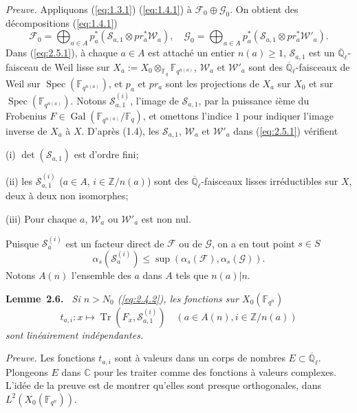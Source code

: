 \documentclass[10pt,a4paper]{article}
\makeatletter
\theoremstyle{plain}
\theoremstyle{definition}
\newenvironment{manualblock}[4]{%
  \par\medskip\noindent\textbf{#1~#2#3.}\def\@currentlabel{#2}\label{#4}\itshape\ }{\par\normalfont\medskip}
\DeclareMathOperator{\Spec}{Spec}
\DeclareMathOperator{\Gal}{Gal}
\DeclareMathOperator{\tr}{Tr}
\makeatother
\begin{document}
\noindent\textit{Preuve.} Appliquons (\ref{eq:1.3.1}) (\ref{eq:1.4.1}) \`a $\mathcal{F}_0 \oplus \mathcal{G}_0$. On obtient des d\'ecompositions (\ref{eq:1.4.1})
\begin{equation}\label{eq:2.5.1}
\mathcal{F}_0 = \bigoplus_{a \in A} p_a^*(\mathcal{S}_{a,1} \otimes pr_a^* \mathcal{W}_a), \quad \mathcal{G}_0 = \bigoplus_{a \in A} p_a^*(\mathcal{S}_{a,1} \otimes pr_a^* \mathcal{W}'_a).
\end{equation}
Dans (\ref{eq:2.5.1}), \`a chaque $a \in A$ est attach\'e un entier $n(a) \geq 1$, $\mathcal{S}_{a,1}$ est un $\overline{\mathbb{Q}}_\ell$-faisceau de Weil lisse sur $X_a := X_0 \otimes_{\mathbb{F}_q} \mathbb{F}_{q^{n(a)}}$, $\mathcal{W}_a$ et $\mathcal{W}'_a$ sont des $\overline{\mathbb{Q}}_\ell$-faisceaux de Weil sur $\Spec(\mathbb{F}_{q^{n(a)}})$, et $p_a$ et $pr_a$ sont les projections de $X_a$ sur $X_0$ et sur $\Spec(\mathbb{F}_{q^{n(a)}})$. Notons $\mathcal{S}_{a,1}^{(i)}$, l'image de $\mathcal{S}_{a,1}$, par la puissance $i$\`eme du Frobenius $F \in \Gal(\mathbb{F}_{q^{n(a)}}/\mathbb{F}_q)$, et omettons l'indice $1$ pour indiquer l'image inverse de $X_a$ \`a $X$. D'apr\`es (1.4), les $\mathcal{S}_{a,1}$, $\mathcal{W}_a$ et $\mathcal{W}'_a$ dans (\ref{eq:2.5.1}) v\'erifient

(i) $\det(\mathcal{S}_{a,1})$ est d'ordre fini;

(ii) les $\mathcal{S}_{a,1}^{(i)}$ ($a \in A$, $i \in \mathbb{Z}/n(a)$) sont des $\overline{\mathbb{Q}}_\ell$-faisceaux lisses irr\'eductibles sur $X$, deux \`a deux non isomorphes;

(iii) Pour chaque $a$, $\mathcal{W}_a$ ou $\mathcal{W}'_a$ est non nul.

Puisque $\mathcal{S}_a^{(i)}$ est un facteur direct de $\mathcal{F}$ ou de $\mathcal{G}$, on a en tout point $s \in S$
\[
\alpha_s(\mathcal{S}_a^{(i)}) \leq \sup(\alpha_s(\mathcal{F}), \alpha_s(\mathcal{G})).
\]
Notons $A(n)$ l'ensemble des $a$ dans $A$ tels que $n(a) | n$.

\begin{manualblock}{Lemme}{2.6}{}{lem:2.6}
Si $n > N_0$ (\ref{eq:2.4.2}), les fonctions sur $X_0(\mathbb{F}_{q^n})$
\[
t_{a,i}: x \mapsto \tr(F_x, \mathcal{S}_{a,1}^{(i)}) \quad (a \in A(n), i \in \mathbb{Z}/n(a))
\]
sont lin\'eairement ind\'ependantes.
\end{manualblock}

\noindent\textit{Preuve.} Les fonctions $t_{a,i}$ sont \`a valeurs dans un corps de nombres $E \subset \overline{\mathbb{Q}}_\ell$. Plongeons $E$ dans $\mathbb{C}$ pour les traiter comme des fonctions \`a valeurs complexes. L'id\'ee de la preuve est de montrer qu'elles sont presque orthogonales, dans $L^2(X_0(\mathbb{F}_{q^n}))$.
\end{document}
